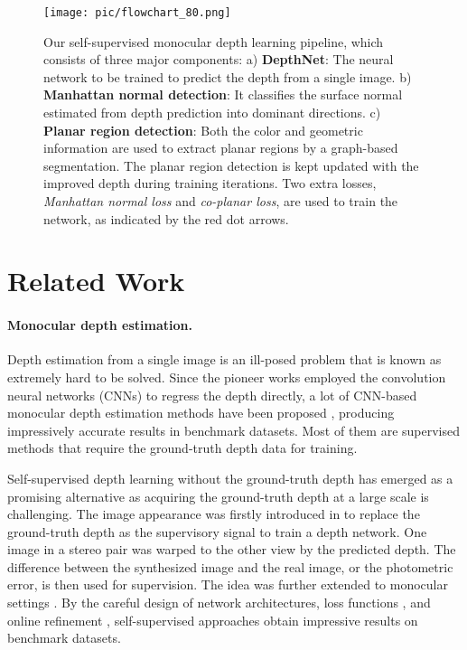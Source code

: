\documentclass[10pt,twocolumn,letterpaper]{article}
\begin{document}
\begin{figure*}[ht]		
	\centering  
	\texttt{[image: pic/flowchart\_80.png]} 	\caption{Our self-supervised monocular depth learning pipeline, 
		which consists of three major components: 
		a) \textbf{DepthNet}: The neural network to be trained to predict the depth from a single image. 
		b) \textbf{Manhattan normal detection}: It classifies the surface normal estimated from depth prediction into dominant directions.
		c) \textbf{Planar region detection}: Both the color and geometric information are used to extract planar regions by a graph-based segmentation.
		The planar region detection is kept updated with the improved depth during training iterations.
		Two extra losses, \emph{Manhattan normal loss} and \emph{co-planar loss}, are used to train the network, as indicated by the red dot arrows.}
	\label{fig:flowchart}  
\end{figure*}

\section{Related Work}

\paragraph{Monocular depth estimation.} 
Depth estimation from a single image is an ill-posed problem that is known as extremely hard to be solved. Since the pioneer works\cite{eigen2014depth,eigen2015predicting} employed the convolution neural networks (CNNs) to regress the depth directly, a lot of CNN-based monocular depth estimation methods have been proposed \cite{liu2015learning,laina2016deeper,kim2016unified,wofk2019fastdepth,fu2018deep}, producing impressively accurate results in benchmark datasets. Most of them are supervised methods that require the ground-truth depth data for training.

Self-supervised depth learning without the ground-truth depth has emerged as a promising alternative as acquiring the ground-truth depth at a large scale is challenging. The image appearance was firstly introduced in \cite{godard2017unsupervised} to replace the ground-truth depth as the supervisory signal to train a depth network. One image in a stereo pair was warped to the other view by the predicted depth. The difference between the synthesized image and the real image, or the photometric error, is then used for supervision. The idea was further extended to monocular settings \cite{zhou2017unsupervised}\cite{godard2017unsupervised}. By the careful design of network architectures\cite{godard2019digging}, loss functions \cite{shu2020feature}, and online refinement \cite{chen2019self}, self-supervised approaches obtain impressive results on benchmark datasets.
\end{document}
